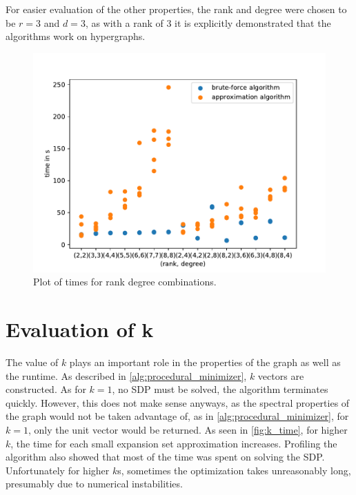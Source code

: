 For easier evaluation of the other properties, the rank and degree were chosen to be $r=3$ and $d=3$, as with a rank of $3$ it is explicitly demonstrated that the algorithms work on hypergraphs.
\begin{figure}
	\centering
	\includegraphics[scale=0.8]{figures/rank_degree_combinations_all_logs.pdf}
	\caption[Plot times rank degree combinations]{Plot of times for rank degree combinations.\label{fig:rank_degree_times}}
\end{figure}


\section{Evaluation of k}

The value of $k$ plays an important role in the properties of the graph as well as the runtime. As described in \cref{alg:procedural_minimizer}, $k$ vectors are constructed.
As for $k = 1$, no SDP must be solved, the algorithm terminates quickly. However, this does not make sense anyways, as the spectral properties of the graph would not be taken advantage of, as in \cref{alg:procedural_minimizer}, for $k=1$, only the unit vector would be returned.
As seen in \cref{fig:k_time}, for higher $k$, the time for each small expansion set approximation increases. Profiling the algorithm also showed that most of the time was spent on solving the SDP. Unfortunately for higher $k$s, sometimes the optimization takes unreasonably long, presumably due to numerical instabilities.

